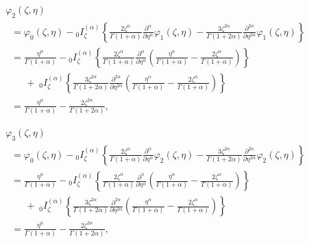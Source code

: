 \documentclass[10pt]{NSP1}
\begin{document}
\begin{equation}
\label{eq39}
\begin{array}{lllllll}
\varphi _2 \left( {\zeta ,\eta } \right) \\
\;\; =\varphi _0 \left( {\zeta ,\eta } \right)-{ }_0I_\zeta ^{\left( \alpha
\right)}\left\{ {\frac{2\zeta ^\alpha }{\Gamma \left( {1+\alpha }
\right)}\frac{\partial ^\alpha }{\partial \eta ^\alpha }\varphi _1 \left(
{\zeta ,\eta } \right)-\frac{3\zeta ^{2\alpha }}{\Gamma \left( {1+2\alpha }
\right)}\frac{\partial ^{2\alpha }}{\partial \eta ^{2\alpha }}\varphi _1
\left( {\zeta ,\eta } \right)} \right\} \\
\;\; =\frac{\eta ^\alpha }{\Gamma \left( {1+\alpha } \right)}-{ }_0I_\zeta
^{\left( \alpha \right)}\left\{ {\frac{2\zeta ^\alpha }{\Gamma \left(
{1+\alpha } \right)}\frac{\partial ^\alpha }{\partial \eta ^\alpha }\left(
{\frac{\eta ^\alpha }{\Gamma \left( {1+\alpha } \right)}-\frac{2\zeta
^\alpha }{\Gamma \left( {1+\alpha } \right)}} \right)} \right\} \\
\qquad +\;_0I_\zeta ^{\left( \alpha \right)}\left\{ {\frac{3\zeta ^{2\alpha
}}{\Gamma \left( {1+2\alpha } \right)}\frac{\partial ^{2\alpha }}{\partial
\eta ^{2\alpha }}\left( {\frac{\eta ^\alpha }{\Gamma \left( {1+\alpha }
\right)}-\frac{2\zeta ^\alpha }{\Gamma \left( {1+\alpha } \right)}} \right)}
\right\} \\
\;\; =\frac{\eta ^\alpha }{\Gamma \left( {1+\alpha } \right)}-\frac{2\zeta
^{2\alpha }}{\Gamma \left( {1+2\alpha } \right)} ,
 \end{array}
\end{equation}

\begin{equation}
\label{eq40}
\begin{array}{lllllll}
 \varphi _3 \left( {\zeta ,\eta } \right) \\
\;\; =\varphi _0 \left( {\zeta ,\eta } \right)-{ }_0I_\zeta ^{\left( \alpha
\right)}\left\{ {\frac{2\zeta ^\alpha }{\Gamma \left( {1+\alpha }
\right)}\frac{\partial ^\alpha }{\partial \eta ^\alpha }\varphi _2 \left(
{\zeta ,\eta } \right)-\frac{3\zeta ^{2\alpha }}{\Gamma \left( {1+2\alpha }
\right)}\frac{\partial ^{2\alpha }}{\partial \eta ^{2\alpha }}\varphi _2
\left( {\zeta ,\eta } \right)} \right\} \\
\;\; =\frac{\eta ^\alpha }{\Gamma \left( {1+\alpha } \right)}-{ }_0I_\zeta
^{\left( \alpha \right)}\left\{ {\frac{2\zeta ^\alpha }{\Gamma \left(
{1+\alpha } \right)}\frac{\partial ^\alpha }{\partial \eta ^\alpha }\left(
{\frac{\eta ^\alpha }{\Gamma \left( {1+\alpha } \right)}-\frac{2\zeta
^\alpha }{\Gamma \left( {1+\alpha } \right)}} \right)} \right\} \\
\qquad +\;_0I_\zeta ^{\left( \alpha \right)}\left\{ {\frac{3\zeta ^{2\alpha
}}{\Gamma \left( {1+2\alpha } \right)}\frac{\partial ^{2\alpha }}{\partial
\eta ^{2\alpha }}\left( {\frac{\eta ^\alpha }{\Gamma \left( {1+\alpha }
\right)}-\frac{2\zeta ^\alpha }{\Gamma \left( {1+\alpha } \right)}} \right)}
\right\} \\
\;\; =\frac{\eta ^\alpha }{\Gamma \left( {1+\alpha } \right)}-\frac{2\zeta
^{2\alpha }}{\Gamma \left( {1+2\alpha } \right)},
 \end{array}
\end{equation}
\end{document}

